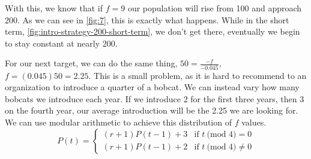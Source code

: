 \documentclass{article}
\begin{document}
With this, we know that if $f = 9$ our population will rise from 100 and approach 200. As we can see in \cref{fig:7}, this is exactly what happens. While in the short term, \cref{fig:intro-strategy-200-short-term}, we don't get there, eventually we begin to stay constant at nearly 200.

For our next target, we can do the same thing, $50 = \frac{-f}{-0.045}$, $f = (0.045)50 = 2.25$. This is a small problem, as it is hard to recommend to an organization to introduce a quarter of a bobcat. We can instead vary how many bobcats we introduce each year. If we introduce 2 for the first three years, then 3 on the fourth year, our average introduction will be the 2.25 we are looking for. We can use modular arithmetic to achieve this distribution of $f$ values.
\begin{equation}\label{eq:intro-strategy-50}
    P(t) = \begin{cases}
        (r + 1)P(t-1) + 3 & \text{if $t \ ($mod $4)  = 0$}\\
        (r + 1)P(t-1) + 2 & \text{if $t \ ($mod $4) \ne 0$}
    \end{cases}
\end{equation}
\end{document}
